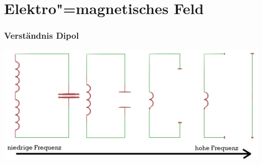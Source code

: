 \section*{Elektro"=magnetisches Feld}

\begin{frame}
  \frametitle{Verständnis Dipol}
  \begin{center}
    \includegraphics[width=1\textwidth,height=.85\textheight,keepaspectratio]{a08/dipol_entstehung.png}\\
  \end{center}
\end{frame}

